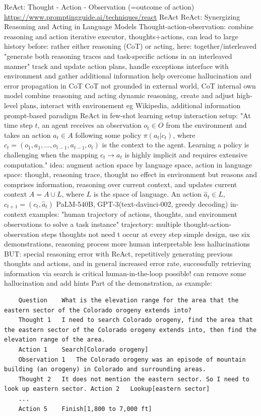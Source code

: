 \documentclass{article}
\begin{document}
ReAct: Thought - Action - Observation (=outcome of action)
\url{https://www.promptingguide.ai/techniques/react}
ReAct \cite{yao_react_2023} {ReAct}: {Synergizing} {Reasoning} and {Acting} in {Language} {Models}
Thought-action-observation: combine reasoning and action
iterative executor, thoughts+actions, can lead to large history
before: rather either reasoning (CoT) or acting, here: together/interleaved
"generate both reasoning traces and task-specific actions in an interleaved manner"
track and update action plans, handle exceptions
interface with environment and gather additional information
help overcome hallucination and error propagation in CoT
CoT not grounded in external world, CoT internal own model
combine reasoning and acting
dynamic reasoning, create and adjust high-level plans, interact with environement eg Wikipedia, additional information
prompt-based paradigm
ReAct in few-shot learning setup
interaction setup: 
"At time step $t$, an agent receives an observation $o_t \in O$ from the environment and takes an action $a_t \in A$ following some policy $\pi(a_t | c_t)$, where $c_t = (o_1, a_1, \ldots, o_{t-1}, a_{t-1}, o_t)$ is the context to the agent. Learning a policy is challenging when the mapping $c_t \rightarrow a_t$ is highly implicit and requires extensive computation."
idea: augment action space by language space, action in language space: thought, reasoning trace, thought no effect in environment but reasons and comprises information, reasoning over current context, and updates current context
$A = A \cup L$, where $L$ is the space of language. An action $\hat{a}_t \in L$, $c_{t+1} = (c_t, \hat{a}_t)$
PaLM-540B, GPT-3(text-davinci-002, greedy decoding) 
in-context examples: "human trajectory of actions, thoughts, and environment observations to solve a task instance"
trajectory: multiple thought-action-observation steps
thoughts not need t occur at every step
simple design, use six demonstrations, reasoning process more human interpretable
less hallucinations
BUT: special reasoning error with ReAct, repetitively generating previous thoughts and actions, and in general increased error rate, successfully retrieving information via search is critical
human-in-the-loop possible!
can remove some hallucination and add hints
Part of the demonstration, as example:
\begin{verbatim}
	Question	What is the elevation range for the area that the eastern sector of the Colorado orogeny extends into? 
	Thought 1	I need to search Colorado orogeny, find the area that the eastern sector of the Colorado orogeny extends into, then find the elevation range of the area. 
	Action 1	Search[Colorado orogeny] 
	Observation 1	The Colorado orogeny was an episode of mountain building (an orogeny) in Colorado and surrounding areas. 
	Thought 2	It does not mention the eastern sector. So I need to look up eastern sector. Action 2	Lookup[eastern sector]
	...
	Action 5	Finish[1,800 to 7,000 ft]
\end{verbatim}
\end{document}
